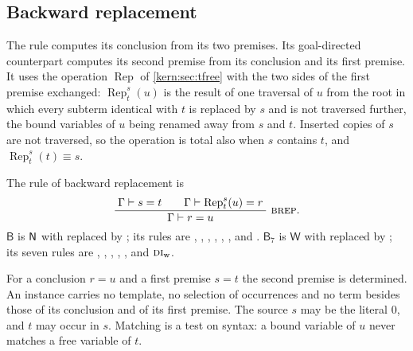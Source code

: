 \subsection{Backward replacement}
\label{kern:sec:brep}

The rule  computes its conclusion from its two premises.  Its
goal-directed counterpart computes its second premise from its conclusion and
its first premise.  It uses the operation $\operatorname{Rep}$ of
\cref{kern:sec:tfree} with the two sides of the first premise exchanged:
$\operatorname{Rep}_{t}^{s}(u)$ is the result of one traversal of $u$ from
the root in which every subterm identical with $t$ is replaced by $s$ and is
not traversed further, the bound variables of $u$ being renamed away from $s$
and $t$.  Inserted copies of $s$ are not traversed, so the operation is total
also when $s$ contains $t$, and $\operatorname{Rep}_{t}^{s}(t)\equiv s$.

\begin{definition}
\label{kern:def:B}
The rule of backward replacement is
\[
 \infrule{\Gamma\proves s=t\qquad
          \Gamma\proves\operatorname{Rep}_{t}^{s}(u)=r}
         {\Gamma\proves r=u}\ \rulename{BRep}.
\]
$\mathsf{B}$ is $\mathsf{N}$ with  replaced by ; its
rules are , , , ,
, ,  and .
$\mathsf{B}_{7}$ is $\mathsf{W}$ with  replaced by
; its seven rules are , ,
, , ,  and
$\rulename{DI}_{\mathrm{w}}$.
\end{definition}

For a conclusion $r=u$ and a first premise $s=t$ the second premise is
determined.  An instance carries no template, no selection of occurrences
and no term besides those of its conclusion and of its first premise.  The
source $s$ may be the literal $0$, and $t$ may occur in $s$.  Matching is a
test on syntax: a bound variable of $u$ never matches a free variable of $t$.

